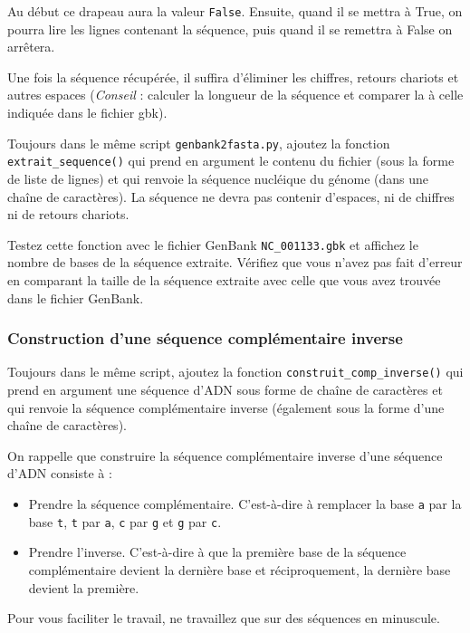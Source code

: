 \documentclass[a4paper,11pt,twoside]{book}
\providecommand{\tightlist}{%
  \setlength{\itemsep}{0pt}\setlength{\parskip}{0pt}}
\begin{document}
Au début ce drapeau aura la valeur \texttt{False}. Ensuite, quand il se
mettra à True, on pourra lire les lignes contenant la séquence, puis
quand il se remettra à False on arrêtera.

Une fois la séquence récupérée, il suffira d'éliminer les chiffres,
retours chariots et autres espaces (\emph{Conseil} : calculer la
longueur de la séquence et comparer la à celle indiquée dans le fichier
gbk).

Toujours dans le même script \texttt{genbank2fasta.py}, ajoutez la
fonction \texttt{extrait\_sequence()} qui prend en argument le contenu
du fichier (sous la forme de liste de lignes) et qui renvoie la séquence
nucléique du génome (dans une chaîne de caractères). La séquence ne
devra pas contenir d'espaces, ni de chiffres ni de retours chariots.

Testez cette fonction avec le fichier GenBank \texttt{NC\_001133.gbk} et
affichez le nombre de bases de la séquence extraite. Vérifiez que vous
n'avez pas fait d'erreur en comparant la taille de la séquence extraite
avec celle que vous avez trouvée dans le fichier GenBank.

\subsubsection{Construction d'une séquence complémentaire
inverse}\label{construction-dune-suxe9quence-compluxe9mentaire-inverse}

Toujours dans le même script, ajoutez la fonction
\texttt{construit\_comp\_inverse()} qui prend en argument une séquence
d'ADN sous forme de chaîne de caractères et qui renvoie la séquence
complémentaire inverse (également sous la forme d'une chaîne de
caractères).

On rappelle que construire la séquence complémentaire inverse d'une
séquence d'ADN consiste à :

\begin{itemize}
\tightlist
\item
  Prendre la séquence complémentaire. C'est-à-dire à remplacer la base
  \texttt{a} par la base \texttt{t}, \texttt{t} par \texttt{a},
  \texttt{c} par \texttt{g} et \texttt{g} par \texttt{c}.
\item
  Prendre l'inverse. C'est-à-dire à que la première base de la séquence
  complémentaire devient la dernière base et réciproquement, la dernière
  base devient la première.
\end{itemize}

Pour vous faciliter le travail, ne travaillez que sur des séquences en
minuscule.
\end{document}
